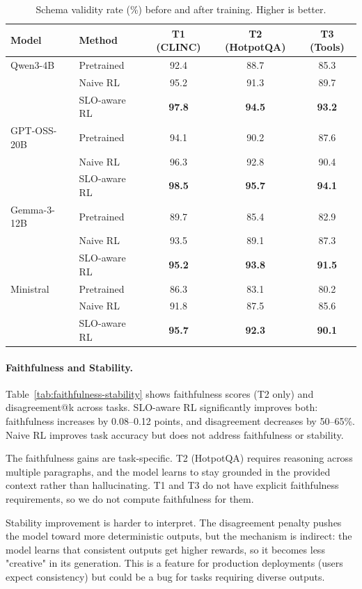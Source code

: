\documentclass[11pt]{article}
\begin{document}
\begin{table}[t]
\centering
\caption{Schema validity rate (\%) before and after training. Higher is better.}
\label{tab:structure}
\begin{tabular}{l l ccc}
\toprule
\textbf{Model} & \textbf{Method} & \textbf{T1 (CLINC)} & \textbf{T2 (HotpotQA)} & \textbf{T3 (Tools)} \\
\midrule
Qwen3-4B & Pretrained & 92.4 & 88.7 & 85.3 \\
& Naive RL & 95.2 & 91.3 & 89.7 \\
& SLO-aware RL & \textbf{97.8} & \textbf{94.5} & \textbf{93.2} \\
\midrule
GPT-OSS-20B & Pretrained & 94.1 & 90.2 & 87.6 \\
& Naive RL & 96.3 & 92.8 & 90.4 \\
& SLO-aware RL & \textbf{98.5} & \textbf{95.7} & \textbf{94.1} \\
\midrule
Gemma-3-12B & Pretrained & 89.7 & 85.4 & 82.9 \\
& Naive RL & 93.5 & 89.1 & 87.3 \\
& SLO-aware RL & \textbf{95.2} & \textbf{93.8} & \textbf{91.5} \\
\midrule
Ministral & Pretrained & 86.3 & 83.1 & 80.2 \\
& Naive RL & 91.8 & 87.5 & 85.6 \\
& SLO-aware RL & \textbf{95.7} & \textbf{92.3} & \textbf{90.1} \\
\bottomrule
\end{tabular}
\end{table}

\paragraph{Faithfulness and Stability.}
Table~\ref{tab:faithfulness-stability} shows faithfulness scores (T2 only) and disagreement@k across tasks.
SLO-aware RL significantly improves both: faithfulness increases by 0.08--0.12 points, and disagreement decreases by 50--65\%.
Naive RL improves task accuracy but does not address faithfulness or stability.

The faithfulness gains are task-specific.
T2 (HotpotQA) requires reasoning across multiple paragraphs, and the model learns to stay grounded in the provided context rather than hallucinating.
T1 and T3 do not have explicit faithfulness requirements, so we do not compute faithfulness for them.

Stability improvement is harder to interpret.
The disagreement penalty pushes the model toward more deterministic outputs, but the mechanism is indirect: the model learns that consistent outputs get higher rewards, so it becomes less "creative" in its generation.
This is a feature for production deployments (users expect consistency) but could be a bug for tasks requiring diverse outputs.
\end{document}
